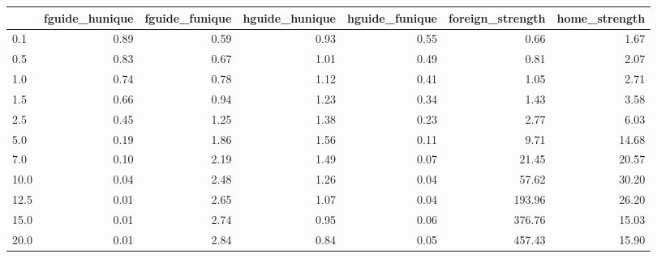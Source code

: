 \begin{tabular}{lrrrrrr}
\toprule
 & fguide_hunique & fguide_funique & hguide_hunique & hguide_funique & foreign_strength & home_strength \\
\midrule
0.1 & 0.89 & 0.59 & 0.93 & 0.55 & 0.66 & 1.67 \\
0.5 & 0.83 & 0.67 & 1.01 & 0.49 & 0.81 & 2.07 \\
1.0 & 0.74 & 0.78 & 1.12 & 0.41 & 1.05 & 2.71 \\
1.5 & 0.66 & 0.94 & 1.23 & 0.34 & 1.43 & 3.58 \\
2.5 & 0.45 & 1.25 & 1.38 & 0.23 & 2.77 & 6.03 \\
5.0 & 0.19 & 1.86 & 1.56 & 0.11 & 9.71 & 14.68 \\
7.0 & 0.10 & 2.19 & 1.49 & 0.07 & 21.45 & 20.57 \\
10.0 & 0.04 & 2.48 & 1.26 & 0.04 & 57.62 & 30.20 \\
12.5 & 0.01 & 2.65 & 1.07 & 0.04 & 193.96 & 26.20 \\
15.0 & 0.01 & 2.74 & 0.95 & 0.06 & 376.76 & 15.03 \\
20.0 & 0.01 & 2.84 & 0.84 & 0.05 & 457.43 & 15.90 \\
\bottomrule
\end{tabular}
